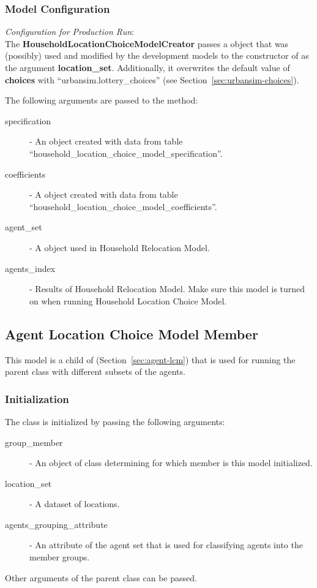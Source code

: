 \subsubsection{Model Configuration}
\modelsindex
%
{\em Configuration for Production Run}:\\[1mm]
The {\bf HouseholdLocationChoiceModelCreator} passes a
 object that was (possibly) used and modified by the
development models to the constructor of  as
the argument {\bf location_set}. Additionally, it overwrites the default
value of {\bf choices} with ``urbansim.lottery_choices'' (see
Section~\ref{sec:urbansim-choices}).

The following arguments are passed to
  the  method:
\begin{description}
\item[specification] - An  object created with
  data from table ``household_location_choice_model_specification''. 
\item[coefficients] - A  object created with data from
  table ``household_location_choice_model_coefficients''. 
\item[agent_set] - A  object used in Household Relocation
  Model. 
\item[agents_index] - Results of Household Relocation Model. Make sure this model is turned on 
when running Household Location Choice Model.
\end{description}


\subsection{Agent Location Choice Model Member}
%
\modelsindex
\label{sec:agent-lcm-member}
%
This model is a child of  (Section~\ref{sec:agent-lcm}) that is used 
for running the parent class with different subsets of the agents.

\subsubsection{Initialization}
%
The class is initialized by passing the following arguments:
\begin{description}
\item[group_member] - An object of class  determining for which member is this model initialized.
\item[location_set] - A dataset of locations.
\item[agents_grouping_attribute] - An attribute of the agent set that is used for classifying agents into the member groups. 
\end{description}
Other arguments of the parent class can be passed. 

